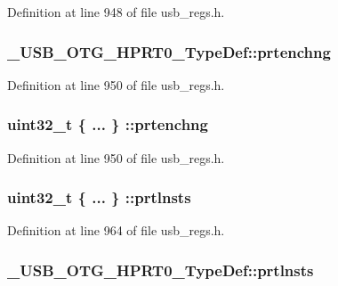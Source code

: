 Definition at line 948 of file usb\-\_\-regs.\-h.

\hypertarget{group___u_s_b___o_t_g___d_r_i_v_e_r_ga328646f280716f47c42621dd7e06f0a9}{
\subsubsection[{prtenchng}]{ \-\_\-\-U\-S\-B\-\_\-\-O\-T\-G\-\_\-\-H\-P\-R\-T0\-\_\-\-Type\-Def\-::prtenchng}}\label{group___u_s_b___o_t_g___d_r_i_v_e_r_ga328646f280716f47c42621dd7e06f0a9}


Definition at line 950 of file usb\-\_\-regs.\-h.

\hypertarget{group___u_s_b___o_t_g___d_r_i_v_e_r_ga91626500b4d9aec851558772bb744dcf}{
\subsubsection[{prtenchng}]{\setlength{\rightskip}{0pt plus 5cm}uint32\-\_\-t \{ ... \} \-::prtenchng}}\label{group___u_s_b___o_t_g___d_r_i_v_e_r_ga91626500b4d9aec851558772bb744dcf}


Definition at line 950 of file usb\-\_\-regs.\-h.

\hypertarget{group___u_s_b___o_t_g___d_r_i_v_e_r_ga6f8ebcf0a4ad3a68eff029cfe412cfea}{
\subsubsection[{prtlnsts}]{\setlength{\rightskip}{0pt plus 5cm}uint32\-\_\-t \{ ... \} \-::prtlnsts}}\label{group___u_s_b___o_t_g___d_r_i_v_e_r_ga6f8ebcf0a4ad3a68eff029cfe412cfea}


Definition at line 964 of file usb\-\_\-regs.\-h.

\hypertarget{group___u_s_b___o_t_g___d_r_i_v_e_r_ga1eb1bfa9b25d1d632b5a744db9fcc7e5}{
\subsubsection[{prtlnsts}]{ \-\_\-\-U\-S\-B\-\_\-\-O\-T\-G\-\_\-\-H\-P\-R\-T0\-\_\-\-Type\-Def\-::prtlnsts}}\label{group___u_s_b___o_t_g___d_r_i_v_e_r_ga1eb1bfa9b25d1d632b5a744db9fcc7e5}


